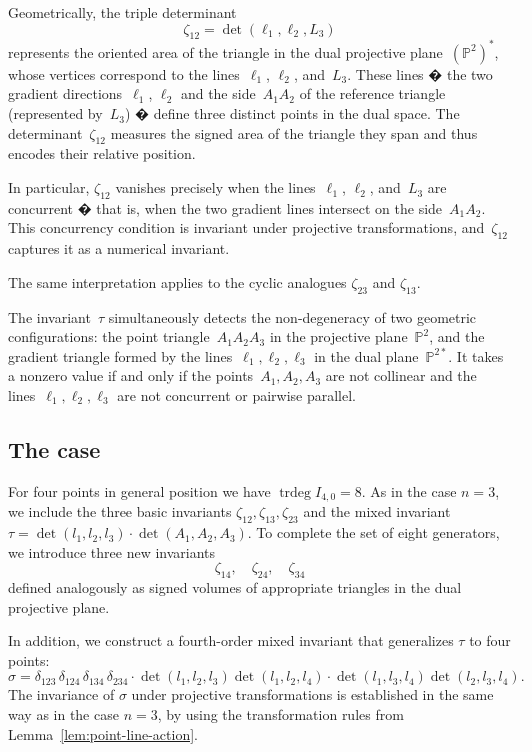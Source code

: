 \documentclass[12pt,reqno]{amsart}
\begin{document}
Geometrically, the triple determinant
\[
\zeta_{12} = \det(\ell_1, \ell_2, L_3)
\]
represents the oriented area of the triangle in the dual projective plane~$(\mathbb{P}^2)^*$, whose vertices correspond to the lines~$\ell_1$, $\ell_2$, and~$L_3$. These lines � the two gradient directions~$\ell_1$, $\ell_2$ and the side~$A_1A_2$ of the reference triangle (represented by~$L_3$) � define three distinct points in the dual space. The determinant~$\zeta_{12}$ measures the signed area of the triangle they span and thus encodes their relative position.

In particular, $\zeta_{12}$ vanishes precisely when the lines~$\ell_1$, $\ell_2$, and~$L_3$ are concurrent � that is, when the two gradient lines intersect on the side~$A_1A_2$. This concurrency condition is invariant under projective transformations, and~$\zeta_{12}$ captures it as a numerical invariant.

The same interpretation applies to the cyclic analogues
$\zeta_{23}$ and $\zeta_{13}$.

The invariant~$\tau$ simultaneously detects the non-degeneracy of two geometric configurations: the point triangle~$A_1A_2A_3$ in the projective plane~$\mathbb{P}^2$, and the gradient triangle formed by the lines~$\ell_1, \ell_2, \ell_3$ in the dual plane~$\mathbb{P}^{2*}$. It takes a nonzero value if and only if the points~$A_1, A_2, A_3$ are not collinear and the lines~$\ell_1, \ell_2, \ell_3$ are not concurrent or pairwise parallel.


\subsection{\textbf{The case }}

For four points in general position   we have 
$
\operatorname{trdeg} I_{4,0}= 8.
$
As in the case \(n=3\), we include the three basic invariants
\(\zeta_{12}, \zeta_{13}, \zeta_{23}\)
and the mixed invariant
\(\tau = \det(l_1, l_2, l_3) \cdot \det(A_1, A_2, A_3)\).
To complete the set of eight generators, we introduce three new invariants
\[
\zeta_{14},\quad \zeta_{24},\quad \zeta_{34}
\]
defined analogously as signed volumes of appropriate triangles in the dual projective plane.


In addition, we construct a fourth-order mixed invariant that generalizes \(\tau\) to four points:
\[
\sigma = 
\delta_{123} \, \delta_{124} \, \delta_{134} \, \delta_{234} \cdot
\det(l_1, l_2, l_3) \det(l_1, l_2, l_4)
\cdot \det(l_1, l_3, l_4) \det(l_2, l_3, l_4).
\]
The invariance of \(\sigma\) under projective transformations is established in the same way as in the case \(n=3\), by using the transformation rules from Lemma~\ref{lem:point-line-action}.
\end{document}
